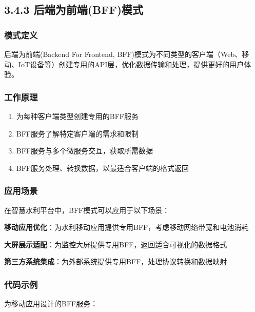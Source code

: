 \subsection{3.4.3
后端为前端(BFF)模式}\label{ux540eux7aefux4e3aux524dux7aefbffux6a21ux5f0f}

\subsubsection{模式定义}\label{ux6a21ux5f0fux5b9aux4e49-2}

后端为前端(Backend For Frontend,
BFF)模式为不同类型的客户端（Web、移动、IoT设备等）创建专用的API层，优化数据传输和处理，提供更好的用户体验。

\subsubsection{工作原理}\label{ux5de5ux4f5cux539fux7406-2}

\begin{enumerate}
\def\labelenumi{\arabic{enumi}.}
\tightlist
\item
  为每种客户端类型创建专用的BFF服务
\item
  BFF服务了解特定客户端的需求和限制
\item
  BFF服务与多个微服务交互，获取所需数据
\item
  BFF服务处理、转换数据，以最适合客户端的格式返回
\end{enumerate}

\subsubsection{应用场景}\label{ux5e94ux7528ux573aux666f-2}

在智慧水利平台中，BFF模式可以应用于以下场景：

\textbf{移动应用优化}：为水利移动应用提供专用BFF，考虑移动网络带宽和电池消耗

\textbf{大屏展示适配}：为监控大屏提供专用BFF，返回适合可视化的数据格式

\textbf{第三方系统集成}：为外部系统提供专用BFF，处理协议转换和数据映射

\subsubsection{代码示例}\label{ux4ee3ux7801ux793aux4f8b-2}

为移动应用设计的BFF服务：


